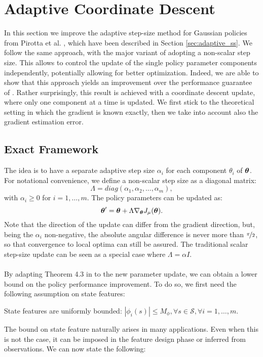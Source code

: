 \section{Adaptive Coordinate Descent}
In this section we improve the adaptive step-size method for Gaussian policies from Pirotta et al. \cite{Pirotta2013adaptive}, which have been described in Section \ref{sec:adaptive_ss}. We follow the same approach, with the major variant of adopting a non-scalar step size. This allows to control the update of the single policy parameter components independently, potentially allowing for better optimization. Indeed, we are able to show that this approach yields an improvement over the performance guarantee of \cite{Pirotta2013adaptive}. Rather surprisingly, this result is achieved with a coordinate descent update, where only one component at a time is updated. 
We first stick to the theoretical setting in which the gradient is known exactly, then we take into account also the gradient estimation error.


\subsection{Exact Framework}
The idea is to have a separate adaptive step size $\alpha_i$ for each component $\theta_i$ of $\boldsymbol{\theta}$. For notational convenience, we define a non-scalar step size as a diagonal matrix:
\[
\Lambda=diag(\alpha_1, \alpha_2,\dotsc, \alpha_m),
\] 
with $\alpha_i \geq 0$ for $i=1,\dotsc,m$. The policy parameters can be updated as:
\[
\boldsymbol{\theta}'=\boldsymbol{\theta}+\Lambda\nabla_{\boldsymbol{\theta}}J_\mu(\boldsymbol{\theta}).
\]
Note that the direction of the update can differ from the gradient direction, but, being the $\alpha_i$ non-negative, the absolute angular difference is never more than $\nicefrac{\pi}{2}$, so that convergence to local optima can still be assured.
The traditional scalar step-size update can be seen as a special case where $\Lambda = \alpha I$.
\paragraph{}
By adapting Theorem 4.3 in \cite{NIPS2013_5186} to the new parameter update, we can obtain a lower bound on the policy performance improvement. To do so, we first need the following assumption on state features:
\begin{assumption}\label{assum:1}
State features are uniformly bounded:
$|\phi_i(s)| \leq M_{\phi}, \forall s \in \mathcal{S}, \forall i=1,\dotsc,m$.
\end{assumption}
The bound on state feature naturally arises in many applications. Even when this is not the case, it can be imposed in the feature design phase or inferred from observations. 
We can now state the following:

